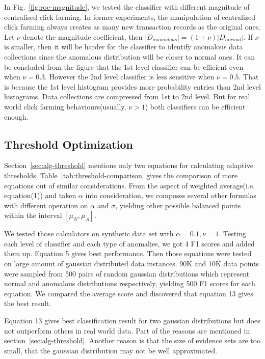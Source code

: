 \documentclass[10pt,conference,letterpaper]{IEEEtran}
\begin{document}
			In Fig.~\ref{fig:roc-magnitude}, we tested the classifier with different magnitude of centralised click farming. In former experiments, the manipulation of centralized click farming always creates as many new transaction records as the original ones. Let $\nu$ denote the magnitude coefficient, then $|D_{anomalous}| = (1 + \nu) |D_{normal}|$. If $\nu $ is smaller, then it will be harder for the classifier to identify anomalous data collections since the anomalous distribution will be closer to normal ones. It can be concluded from the figure that the 1st level classifier can be efficient even when $\nu = 0.3$. However the 2nd level classifier is less sensitive when $\nu = 0.5$. That is because the 1st level histogram provides more probability entries than 2nd level histograms. Data collections are compressed from 1st to 2nd level. But for real world click farming behaviours(usually, $\nu > 1$) both classifiers can be efficient enough.
	
		\subsection{Threshold Optimization}\label{sec:exp-threshold}
			Section~\ref{sec:alg-threshold} mentions only two equations for calculating adaptive thresholds. Table~\ref{tab:threshold-comparison} gives the comparison of more equations out of similar considerations. From the aspect of weighted average(i.e. equation(1)) and taken $\alpha$ into consideration, we composes several other formulas with different operation on $\alpha$ and $\sigma$, yielding other possible balanced points within the interval $[\mu_N, \mu_A]$.
			
			We tested those calculators on synthetic data set with $\alpha = 0.1, \nu = 1$. Testing each level of classifier and each type of anomalies, we got 4 F1 scores and added them up. Equation 5 gives best performance. Then those equations were tested on large amount of gaussian distributed data instances. 90K and 10K data points were sampled from 500 pairs of random gaussian distributions which represent normal and anomalous distributions respectively, yielding 500 F1 scores for each equation. We compared the average score and discovered that equation 13 gives the best result.
	
			Equation 13 gives best classification result for two gaussian distributions but does not outperform others in real world data. Part of the reasons are mentioned in section~\ref{sec:alg-threshold}. Another reason is that the size of evidence sets are too small, that the gaussian distribution may not be well approximated.
	
\end{document}
